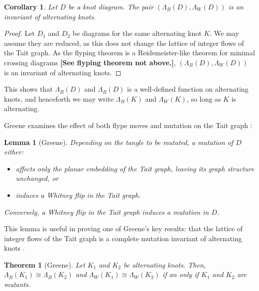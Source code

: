 \documentclass[12pt]{report}
\newcommand{\notered}[1]{{\color{Red} \textbf{#1}}}
\newtheorem*{theorem}{Theorem}
\newtheorem*{lemma}{Lemma}
\newtheorem*{corollary}{Corollary}
\begin{document}
\begin{corollary}
Let $D$ be a knot diagram. The pair $(\Lambda_{B}(D), \Lambda_{W}(D))$ is an invariant of alternating knots.
\end{corollary}

\begin{proof}
Let $D_{1}$ and $D_{2}$ be diagrams for the same alternating knot $K$. We may assume they are reduced, as this does not change the lattice of integer flows of the Tait graph. As the flyping theorem is a Reidemeister-like theorem for minimal crossing diagrams \notered{[See flyping theorem not above.]}, $(\Lambda_{B}(D), \Lambda_{W}(D))$ is an invariant of alternating knots.
\end{proof}

This shows that $\Lambda_{B}(D)$ and $\Lambda_{B}(D)$ is a well-defined function on alternating knots, and henceforth we may write $\Lambda_{B}(K)$ and $\Lambda_{W}(K)$, so long as $K$ is alternating.

Greene examines the effect of both flype moves and mutation on the Tait graph \cite[Lemma 4.5]{lattices-graphs-mutation}:

\begin{lemma}[Greene]
Depending on the tangle to be mutated, a mutation of $D$ either:
\begin{itemize}
\item affects only the planar embedding of the Tait graph, leaving its graph structure unchanged, or
\item induces a Whitney flip in the Tait graph.
\end{itemize}
Conversely, a Whitney flip in the Tait graph induces a mutation in $D$.
\end{lemma}

This lemma is useful in proving one of Greene's key results: that the lattice of integer flows of the Tait graph is a complete mutation invariant of alternating knots \cite[Proposition 4.4]{lattices-graphs-mutation}.

\begin{theorem}[Greene]
Let $K_{1}$ and $K_{2}$ be alternating knots. Then, $\Lambda_{B}(K_{1}) \cong \Lambda_{B}(K_{2})$ and $\Lambda_{W}(K_{1}) \cong \Lambda_{W}(K_{2})$ if an only if $K_{1}$ and $K_{2}$ are mutants.
\end{theorem}
\end{document}
